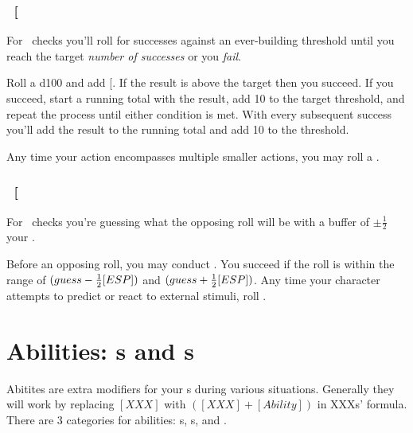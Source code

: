 \subsection{\SPEDful\ {[}\SPED\index{\attribute!\SPEDful}{]}}


\noindent For \SPEDful\ checks you'll roll for successes against an ever-building threshold until you reach the target \textit{number of successes} or you \textit{fail}.

\noindent Roll a d100 and add {[}\SPED{]}. If the result is above the target then you succeed. If you succeed, start a running total with the result, add 10 to the target threshold, and repeat the process until either condition is met. With every subsequent success you'll add the result to the running total and add 10 to the threshold. 
\fillrlinemid

\noindent Any time your action encompasses multiple smaller actions, you may roll a \SPED.


\subsection{\FOREful\ {[}\FORE\index{\attribute!\FOREful}{]}}


\noindent For \FOREful\ checks you're guessing what the opposing roll will be with a buffer of $\pm \frac{1}{2}$ your \FORE .

\noindent Before an opposing roll, you may conduct \FORE. You succeed if the roll is within the range of $(guess - \frac{1}{2}[ESP])$ and $(guess + \frac{1}{2}[ESP])$.
\fillrlinemid
\noindent Any time your character attempts to predict or react to external stimuli, roll \FORE.


\chapter{Abilities: \skill s and \techn s}

Abitites are extra modifiers for your \attribute s during various situations. Generally they will work by replacing $[XXX]$ with $([XXX]+[Ability])$ in XXXs' formula. There are 3 categories for abilities: \skill s, \techn s, and \AWEAWF.

